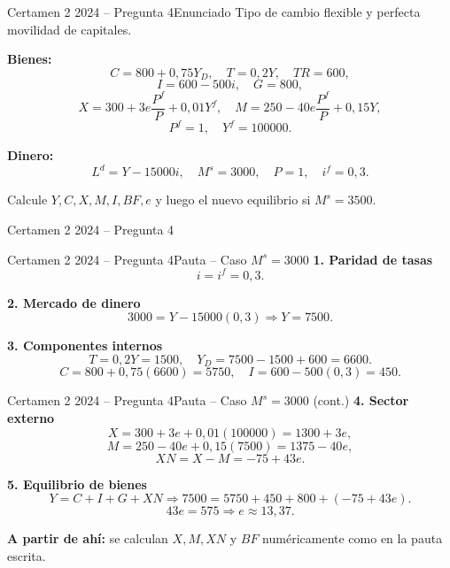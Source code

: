 \documentclass[aspectratio=169]{beamer}
\begin{document}
\begin{frame}{Certamen 2 2024 -- Pregunta 4}{Enunciado}
\small
Tipo de cambio flexible y perfecta movilidad de capitales.

\textbf{Bienes:}
\[
C = 800 + 0{,}75Y_D,\quad T = 0{,}2Y,\quad TR = 600,
\]
\[
I = 600 - 500i,\quad G = 800,
\]
\[
X = 300 + 3e\frac{P^f}{P} + 0{,}01Y^f,\quad
M = 250 - 40e\frac{P^f}{P} + 0{,}15Y,
\]
\[
P^f = 1,\quad Y^f = 100000.
\]

\textbf{Dinero:}
\[
L^d = Y - 15000i,\quad M^s = 3000,\quad P = 1,\quad i^f = 0{,}3.
\]

Calcule $Y,C,X,M,I,BF,e$ y luego el nuevo equilibrio si $M^s = 3500$.
\end{frame}

\begin{frame}{Certamen 2 2024 -- Pregunta 4}
  \vfill
  \centering
  \vfill
\end{frame}

\begin{frame}{Certamen 2 2024 -- Pregunta 4}{Pauta -- Caso $M^s=3000$}
\small
\textbf{1. Paridad de tasas}
\[
i = i^f = 0{,}3.
\]

\textbf{2. Mercado de dinero}
\[
3000 = Y - 15000(0{,}3) \Rightarrow Y = 7500.
\]

\textbf{3. Componentes internos}
\[
T = 0{,}2Y = 1500,\quad
Y_D = 7500 - 1500 + 600 = 6600.
\]
\[
C = 800 + 0{,}75(6600) = 5750,
\quad
I = 600 - 500(0{,}3) = 450.
\]
\end{frame}

\begin{frame}{Certamen 2 2024 -- Pregunta 4}{Pauta -- Caso $M^s=3000$ (cont.)}
\small
\textbf{4. Sector externo}
\[
X = 300 + 3e + 0{,}01(100000) = 1300 + 3e,
\]
\[
M = 250 - 40e + 0{,}15(7500) = 1375 - 40e,
\]
\[
XN = X - M = -75 + 43e.
\]

\textbf{5. Equilibrio de bienes}
\[
Y = C + I + G + XN
\Rightarrow 7500 = 5750 + 450 + 800 + (-75 + 43e).
\]
\[
43e = 575 \Rightarrow e \approx 13{,}37.
\]

\textbf{A partir de ahí:} se calculan $X,M,XN$ y $BF$ numéricamente como en la pauta escrita.
\end{frame}
\end{document}

